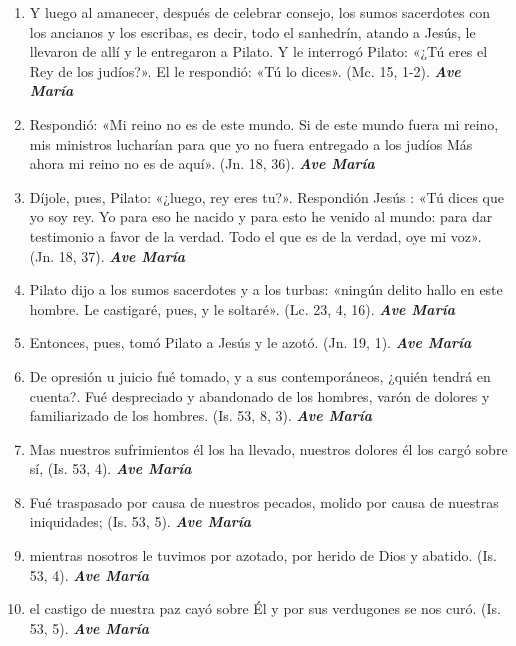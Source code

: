 \documentclass[a4paper,11pt, oneside]{report}
\begin{document}
\begin{enumerate}
  
  \item Y luego al amanecer, después de celebrar consejo, los sumos sacerdotes con los ancianos y los escribas, es decir, todo el sanhedrín, atando a Jesús,
  le llevaron de allí y le entregaron a Pilato. Y le interrogó Pilato: «¿Tú eres el Rey de los judíos?». El le respondió: «Tú lo dices». 
  (Mc. 15, 1-2). \textbf{\textit{Ave María}}

  \item Respondió: «Mi reino no es de este mundo. Si de este mundo fuera mi reino, mis ministros lucharían para que yo no fuera entregado a los judíos
  Más ahora mi reino no es de aquí». (Jn. 18, 36). \textbf{\textit{Ave María}}

  \item Díjole, pues, Pilato: «¿luego, rey eres tu?». Respondión Jesús : «Tú dices que yo soy rey. Yo para eso he nacido y para esto he venido
  al mundo: para dar testimonio a favor de la verdad. Todo el que es de la verdad, oye mi voz». (Jn. 18, 37). \textbf{\textit{Ave María}}

  \item Pilato dijo a los sumos sacerdotes y a los turbas: «ningún delito hallo en este hombre. 
  Le castigaré, pues, y le soltaré». (Lc. 23, 4, 16). \textbf{\textit{Ave María}}

  \item Entonces, pues, tomó Pilato a Jesús y le azotó. (Jn. 19, 1). \textbf{\textit{Ave María}}

  \item De opresión u juicio fué tomado, y a sus contemporáneos, ¿quién tendrá en cuenta?. Fué despreciado y abandonado de los hombres,
  varón de dolores y familiarizado de los hombres. (Is. 53, 8, 3). \textbf{\textit{Ave María}}

  \item Mas nuestros sufrimientos él los ha llevado, nuestros dolores él los cargó sobre sí, (Is. 53, 4). \textbf{\textit{Ave María}}

  \item Fué traspasado por causa de nuestros pecados, molido por causa de nuestras iniquidades; (Is. 53, 5). \textbf{\textit{Ave María}}

  \item mientras nosotros le tuvimos por azotado, por herido de Dios y abatido. (Is. 53, 4). \textbf{\textit{Ave María}}

  \item el castigo de nuestra paz cayó sobre Él y por sus verdugones se nos curó. (Is. 53, 5). \textbf{\textit{Ave María}}

\end{enumerate}
\end{document}
